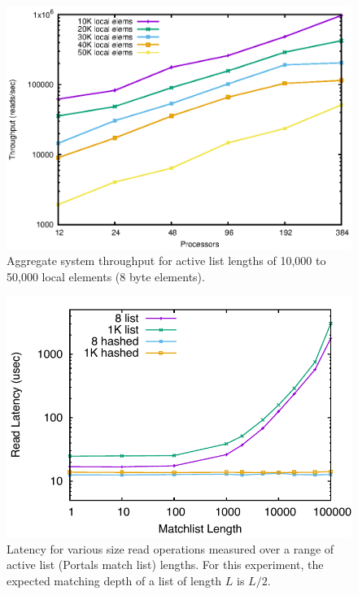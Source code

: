 \begin{figure}
    \centering
    \includegraphics[width=.9\linewidth]{plots/throughput}
    \caption{Aggregate system throughput for active list lengths of 10,000 to 50,000 local elements (8 byte elements).}
    \label{fig:throughput}
\end{figure}

\begin{figure}
    \centering
    \includegraphics[width=.95\linewidth]{plots/mlen}
    \caption{Latency for various size read operations measured over a range of active list (Portals match list) lengths. For this experiment, the expected matching depth of a list of length $L$ is $L/2$.}
    \label{fig:mlen}
\end{figure}

